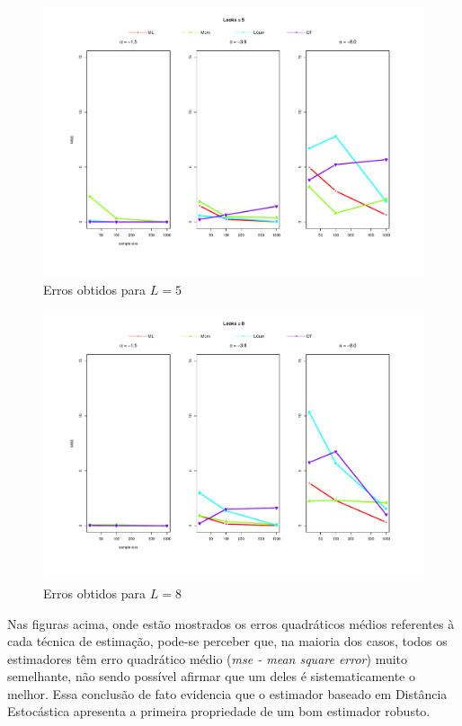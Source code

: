\documentclass[12pt]{article}
\begin{document}
\begin{figure}[H]
     \centering
     \includegraphics[scale=0.5]{plots/mse_L=5.pdf}
     \caption{Erros obtidos para $L=5$}
     \label{graf_14}
\end{figure}
\begin{figure}[H]
     \centering
     \includegraphics[scale=0.5]{plots/mse_L=8.pdf}
     \caption{Erros obtidos para $L=8$}
     \label{graf_15}
\end{figure}

Nas figuras acima, onde estão mostrados os erros quadráticos médios referentes à cada técnica de estimação, pode-se perceber que, na maioria dos casos, todos os estimadores têm erro quadrático médio (\textit{mse - mean square error}) muito semelhante, não sendo possível afirmar que um deles é sistematicamente o melhor. Essa conclusão de fato evidencia que o estimador baseado em Distância Estocástica apresenta a primeira propriedade de um bom estimador robusto.
\end{document}
